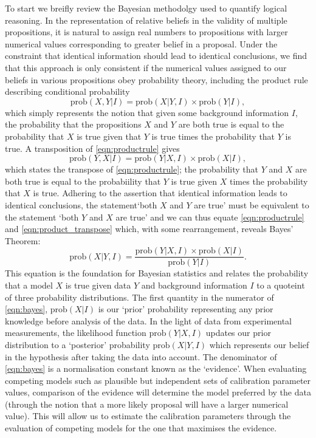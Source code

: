 To start we breifly review the Bayesian methodolgy used to quantify logical reasoning. In the representation of relative beliefs in the validity of multiple propositions, it is natural to assign real numbers to propositions with larger numerical values corresponding to greater belief in a proposal. Under the constraint that identical information should lead to identical conclusions, we find that this approach is only consistent if the numerical values assigned to our beliefs in various propositions obey probability theory, including the product rule describing conditional probability \citep{sivia_skilling}
\begin{equation}
    \mathrm{prob}(X,Y|I) = \mathrm{prob}(X|Y,I) \times \mathrm{prob}(Y|I),
    \label{eqn:productrule}
\end{equation}
which simply represents the notion that given some background information $I$, the probability that the propositions $X$ and $Y$ are both true is equal to the probability that $X$ is true given that $Y$ is true times the probability that $Y$ is true. A transposition of \cref{eqn:productrule} gives
\begin{equation}
    \mathrm{prob}(Y,X|I) = \mathrm{prob}(Y|X,I) \times \mathrm{prob}(X|I),
    \label{eqn:product_transpose}
\end{equation}
which states the transpose of \cref{eqn:productrule}; the probability that $Y$ and $X$ are both true is equal to the probabiility that $Y$ is true given $X$ times the probability that $X$ is true. Adhering to the assertion that identical information leads to identical conclusions, the statement‘both $X$ and $Y$ are true’ must be equivalent to the statement ‘both $Y$ and $X$ are true’ and we can thus equate \cref{eqn:productrule} and \cref{eqn:product_transpose} which, with some rearrangement, reveals Bayes' Theorem:
\begin{equation}
    \mathrm{prob}(X|Y,I) = \frac{\mathrm{prob}(Y|X,I) \times \mathrm{prob}(X|I)}{\mathrm{prob}(Y|I)}.
    \label{eqn:bayes}
\end{equation}
This equation is the foundation for Bayesian statistics and relates the probability that a model $X$ is true given data $Y$ and background information $I$ to a quoteint of three probability distributions. The first quantity in the numerator of \cref{eqn:bayes}, $\mathrm{prob}(X|I)$ is our ‘prior’ probability representing any prior knowledge before analysis of the data. In the light of data from experimental measurements, the likelihood function $\mathrm{prob}(Y|X,I)$ updates our prior distribution to a ‘posterior’ probability $\mathrm{prob}(X|Y,I)$ which represents our belief in the hypothesis after taking the data into account. The denominator of \cref{eqn:bayes} is a normalisation constant known as the ‘evidence’. When evaluating competing models such as plausible but independent sets of calibration parameter values, comparison of the evidence will determine the model preferred by the data (through the notion that a more likely proposal will have a larger numerical value). This will allow us to estimate the calibration parameters through the evaluation of competing models for the one that maximises the evidence.


